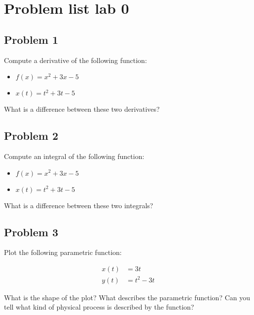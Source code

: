 \documentclass[11pt]{article}
\begin{document}
\section*{Problem list lab 0}

\subsection*{Problem 1}

Compute a derivative of the following function:

\begin{itemize}
    \item $f(x) = x^2 + 3x - 5$
    \item $x(t) = t^2 + 3t - 5$
\end{itemize}

What is a difference between these two derivatives?

\subsection*{Problem 2}

Compute an integral of the following function:

\begin{itemize}
    \item $f(x) = x^2 + 3x - 5$
    \item $x(t) = t^2 + 3t - 5$
\end{itemize}

What is a difference between these two integrals?

\subsection*{Problem 3}

Plot the following parametric function:

\begin{align*}
 x(t) &= 3t \\
 y(t) &= t^2 - 3t
\end{align*}


What is the shape of the plot? What describes the parametric function? Can you tell what kind of physical process is described by the function?
\end{document}
